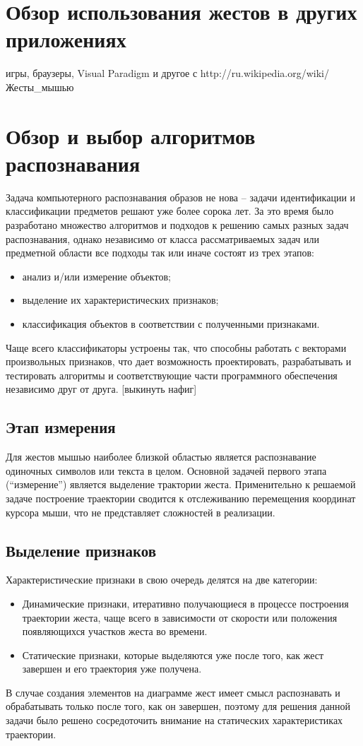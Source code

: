 \documentclass[a5paper]{article}
\begin{document}
\section{Обзор использования жестов в других приложениях}

игры, браузеры, Visual Paradigm и другое с http://ru.wikipedia.org/wiki/Жесты\_мышью

\section{Обзор и выбор алгоритмов распознавания}
Задача компьютерного распознавания образов не нова -- задачи идентификации и классификации предметов решают уже более сорока лет. За это 
время было разработано множество алгоритмов и подходов к решению самых разных задач распознавания, однако независимо от класса 
рассматриваемых задач или предметной области все подходы так или иначе состоят из трех этапов: 
\begin{itemize}
  \item анализ и/или измерение объектов;
  \item выделение их характеристических признаков;
  \item классификация объектов в соответствии с полученными признаками.
\end{itemize}
Чаще всего классификаторы устроены так, что способны работать с векторами произвольных признаков, что дает возможность
проектировать, разрабатывать и тестировать алгоритмы и соответствующие части программного обеспечения независимо друг от друга. [выкинуть нафиг]

\subsection{Этап измерения}
Для жестов мышью наиболее близкой областью является распознавание одиночных символов или текста в целом. Основной задачей первого этапа (``измерение'') 
является выделение трактории жеста. Применительно к решаемой задаче построение траектории сводится к отслеживанию перемещения координат курсора
мыши, что не представляет сложностей в реализации.

\subsection{Выделение признаков}
Характеристические признаки в свою очередь делятся на две категории:
\begin{itemize}
  \item Динамические признаки, итеративно получающиеся в процессе построения траектории жеста, чаще всего в зависимости от скорости или положения
появляющихся участков жеста во времени.
  \item Статические признаки, которые выделяются уже после того, как жест завершен и его траектория уже получена.
\end{itemize}
В случае создания элементов на диаграмме жест имеет смысл распознавать и обрабатывать только после того, как он завершен, поэтому
для решения данной задачи было решено сосредоточить внимание на статических характеристиках траектории. 
\end{document}
